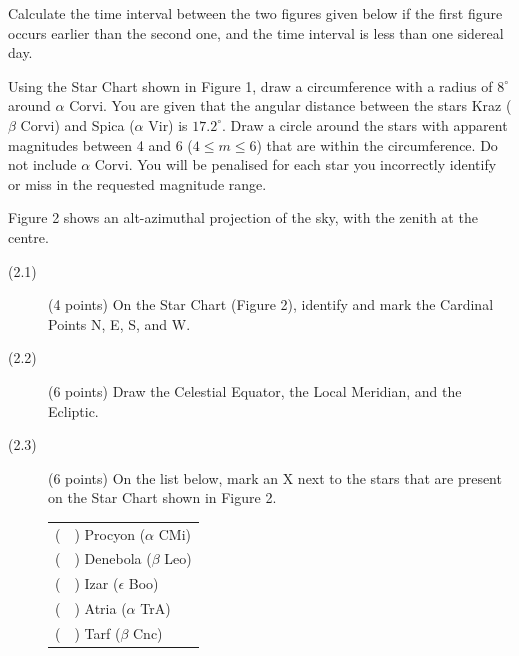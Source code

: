 
Calculate the time interval between the two figures given below if the first
figure occurs earlier than the second one, and the time interval is less than
one sidereal day.


Using the Star Chart shown in Figure 1, draw a circumference with a radius of
$8^\circ$ around $\alpha$ Corvi. You are given that the angular distance
between the stars Kraz ($\beta$ Corvi) and Spica ($\alpha$ Vir) is
$17.2^\circ$. Draw a circle around the stars with apparent magnitudes between
4 and 6 ($4 \le m \le 6$) that are within the circumference. Do not include
$\alpha$ Corvi. You will be penalised for each star you incorrectly identify
or miss in the requested magnitude range.


Figure 2 shows an alt-azimuthal projection of the sky, with the zenith at the
centre.


\begin{description}
\item[(2.1)] (4 points) On the Star Chart (Figure 2), identify and mark the
  Cardinal Points N, E, S, and W.
\item[(2.2)] (6 points) Draw the Celestial Equator, the Local Meridian, and
  the Ecliptic.
\item[(2.3)] (6 points) On the list below, mark an X next to the stars that
  are present on the Star Chart shown in Figure 2.

  \begin{tabular}{l}
  (\ \ ) Procyon ($\alpha$ CMi) \\
  (\ \ ) Denebola ($\beta$ Leo) \\
  (\ \ ) Izar ($\epsilon$ Boo) \\
  (\ \ ) Atria ($\alpha$ TrA) \\
  (\ \ ) Tarf ($\beta$ Cnc) \\
  \end{tabular}
\end{description}

